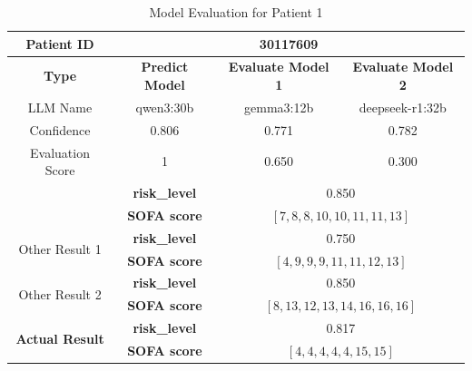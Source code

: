\begin{table}[htbp]
 \centering
 \caption{Model Evaluation for Patient 1}
 \label{tab:patient1}
 \begin{tabular}{cccc}
 \toprule
 \textbf{ Patient ID } & \multicolumn{3}{c}{30117609} \\
 \midrule
 \textbf{ Type } & \textbf{ Predict Model } & \textbf{ Evaluate Model 1 } & \textbf{ Evaluate Model 2 } \\
 LLM Name & qwen3:30b & gemma3:12b & deepseek-r1:32b \\
 Confidence & 0.806 & 0.771 & 0.782 \\
 Evaluation Score & 1 & 0.650 & 0.300 \\
 \midrule
 \addlinespace
 \multirow{2}{*}{\textbf{ Best Result }} & \textbf{ risk\_level } & \multicolumn{2}{c}{0.850} \\
      & \textbf{ SOFA score } & \multicolumn{2}{c}{$[7, 8, 8, 10, 10, 11, 11, 13]$} \\
 \midrule
 \multirow{2}{*}{Other Result 1} & \textbf{ risk\_level } & \multicolumn{2}{c}{0.750} \\
      & \textbf{ SOFA score } & \multicolumn{2}{c}{$[4, 9, 9, 9, 11, 11, 12, 13]$} \\
 \midrule
 \multirow{2}{*}{Other Result 2} & \textbf{ risk\_level } & \multicolumn{2}{c}{0.850} \\
      & \textbf{ SOFA score } & \multicolumn{2}{c}{$[8, 13, 12, 13, 14, 16, 16, 16]$} \\
 \midrule
 \multirow{2}{*}{\textbf{ Actual Result }} & \textbf{ risk\_level } & \multicolumn{2}{c}{0.817} \\
      & \textbf{ SOFA score } & \multicolumn{2}{c}{$[4, 4, 4, 4, 4, 15, 15]$} \\
 \bottomrule
 \end{tabular}
\end{table}

